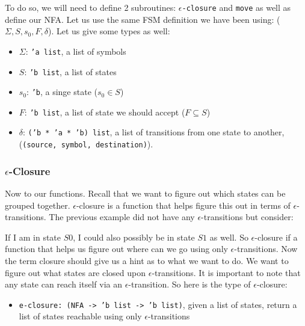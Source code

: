 \documentclass[main.tex]{subfiles}
\begin{document}
To do so, we will need to define 2 subroutines: \texttt{$\epsilon$-closure} and \texttt{move} as well as define our NFA.
Let us use the same FSM definition we have been using: ($\Sigma,S, s_0, F, \delta$).
Let us give some types as well:
\begin{itemize}
    \item $\Sigma$: \texttt{'a list}, a list of symbols
    \item $S$: \texttt{'b list}, a list of states
    \item $s_0$: \texttt{'b}, a singe state ($s_0 \in S$)
    \item $F$: \texttt{'b list}, a list of state we should accept ($F \subseteq S$)
    \item $\delta$: \texttt{('b * 'a * 'b) list}, a list of transitions from one state to another, (\texttt{(source, symbol, destination)}).
\end{itemize}

\subsubsection{$\epsilon$-Closure}
Now to our functions. Recall that we want to figure out which states can be grouped together. 
\texttt{$\epsilon$}-closure is a function that helps figure this out in terms of $\epsilon$-transitions. The previous example did not have any $\epsilon$-transitions but consider: 
\begin{center}
\end{center}
If I am in state $S0$, I could also possibly be in state $S1$ as well. So $\epsilon$-closure if a function that helps us figure out where can we go using only $\epsilon$-transitions. Now the term closure should give us a hint as to what we want to do. We want to figure out what states are closed upon $\epsilon$-transitions. It is important to note that any state can reach itself via an $\epsilon$-transition. So here is the type of $\epsilon$-closure:
\begin{itemize}
    \item \texttt{e-closure: (NFA -> 'b list -> 'b list)}, given a list of states, return a list of states reachable using only $\epsilon$-transitions
\end{itemize}
\end{document}
